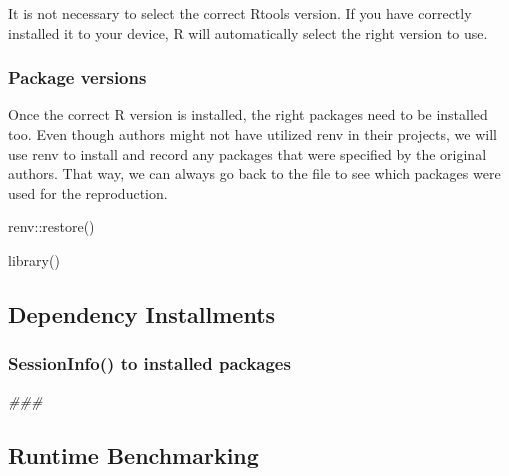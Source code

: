 \documentclass[
  letterpaper,
  DIV=11,
  numbers=noendperiod]{scrartcl}
\newenvironment{Shaded}{\begin{snugshade}}{\end{snugshade}}
\newcommand{\DocumentationTok}[1]{\textcolor[rgb]{0.37,0.37,0.37}{\textit{#1}}}
\newcommand{\FunctionTok}[1]{\textcolor[rgb]{0.28,0.35,0.67}{#1}}
\newcommand{\NormalTok}[1]{\textcolor[rgb]{0.00,0.23,0.31}{#1}}
\newcommand{\SpecialCharTok}[1]{\textcolor[rgb]{0.37,0.37,0.37}{#1}}
\begin{document}
It is not necessary to select the correct Rtools version. If you have
correctly installed it to your device, R will automatically select the
right version to use.

\subsubsection{Package versions}\label{package-versions-1}

Once the correct R version is installed, the right packages need to be
installed too. Even though authors might not have utilized renv in their
projects, we will use renv to install and record any packages that were
specified by the original authors. That way, we can always go back to
the file to see which packages were used for the reproduction.

\begin{Shaded}
\begin{Highlighting}[]
\NormalTok{renv}\SpecialCharTok{::}\FunctionTok{restore}\NormalTok{()}

\FunctionTok{library}\NormalTok{()}
\end{Highlighting}
\end{Shaded}

\subsection{Dependency Installments}\label{dependency-installments}

\subsubsection{SessionInfo() to installed
packages}\label{sessioninfo-to-installed-packages}

\begin{Shaded}
\begin{Highlighting}[]
\DocumentationTok{\#\#\#}
\end{Highlighting}
\end{Shaded}

\subsection{Runtime Benchmarking}\label{runtime-benchmarking}
\end{document}

